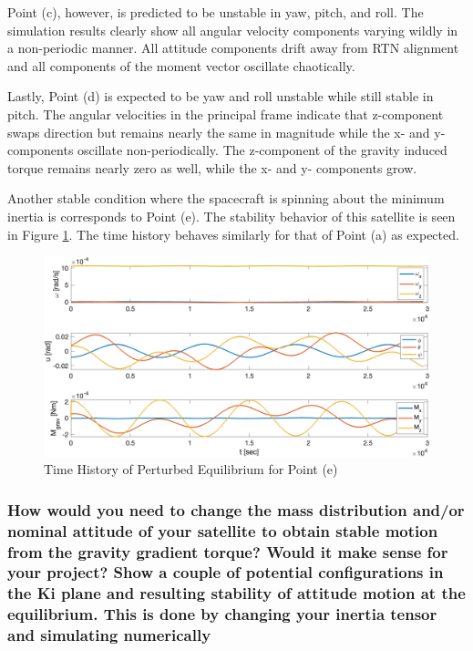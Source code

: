 Point (c), however, is predicted to be unstable in yaw, pitch, and roll. The simulation results clearly show all angular velocity components varying wildly in a non-periodic manner. All attitude components drift away from RTN alignment and all components of the moment vector oscillate chaotically.

Lastly, Point (d) is expected to be yaw and roll unstable while still stable in pitch. The angular velocities in the principal frame indicate that z-component swaps direction but remains nearly the same in magnitude while the x- and y-components oscillate non-periodically. The z-component of the gravity induced torque remains nearly zero as well, while the x- and y- components grow.

Another stable condition where the spacecraft is spinning about the minimum inertia is corresponds to Point (e). The stability behavior of this satellite is seen in Figure \ref{fig:point_e_grav_stability}. The time history behaves similarly for that of Point (a) as expected.

\begin{figure}[H]
    \centering
    \captionsetup{justification = centering}
    \includegraphics[width = 12cm]{Images/PS5/point_e_grav_stability.png}
    \caption{Time History of Perturbed Equilibrium for Point (e)}
    \label{fig:point_e_grav_stability}
\end{figure}

\subsubsection{How would you need to change the mass distribution and/or nominal attitude of your satellite to obtain stable motion from the gravity gradient torque? Would it make sense for your project? Show a couple of potential configurations in the Ki plane and resulting stability of attitude motion at the equilibrium. This is done by changing your inertia tensor and simulating numerically}

